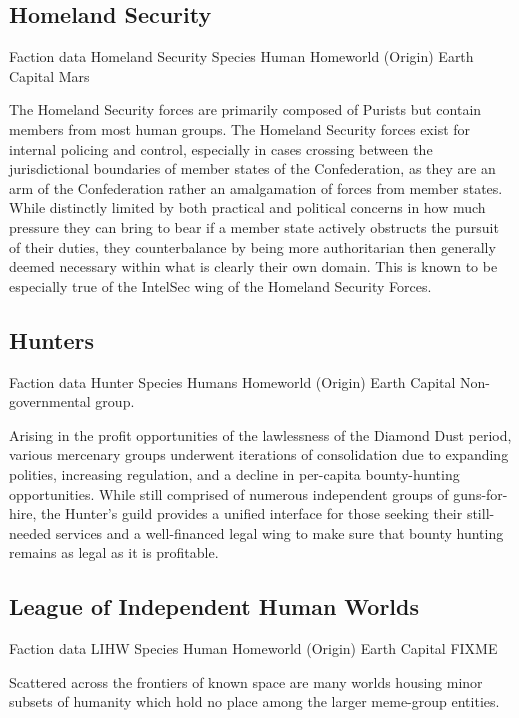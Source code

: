 \subsection{Homeland Security}

Faction data 
Homeland Security 
Species 	Human 
Homeworld (Origin) 	Earth 
Capital 	Mars 

The Homeland Security forces are primarily composed of Purists but
contain members from most human groups. The Homeland Security forces
exist for internal policing and control, especially in cases crossing
between the jurisdictional boundaries of member states of the
Confederation, as they are an arm of the Confederation rather an
amalgamation of forces from member states. While distinctly limited by
both practical and political concerns in how much pressure they can
bring to bear if a member state actively obstructs the pursuit of
their duties, they counterbalance by being more authoritarian then
generally deemed necessary within what is clearly their own
domain. This is known to be especially true of the IntelSec wing of
the Homeland Security Forces.

\subsection{Hunters}

Faction data 
Hunter 
Species 	Humans 
Homeworld (Origin) 	Earth 
Capital 	Non-governmental group. 

Arising in the profit opportunities of the lawlessness of the Diamond
Dust period, various mercenary groups underwent iterations of
consolidation due to expanding polities, increasing regulation, and a
decline in per-capita bounty-hunting opportunities. While still
comprised of numerous independent groups of guns-for-hire, the
Hunter's guild provides a unified interface for those seeking their
still-needed services and a well-financed legal wing to make sure that
bounty hunting remains as legal as it is profitable.

\subsection{League of Independent Human Worlds}

Faction data 
LIHW 
Species 	Human 
Homeworld (Origin) 	Earth 
Capital 	FIXME

Scattered across the frontiers of known space are many worlds housing
minor subsets of humanity which hold no place among the larger
meme-group entities.

